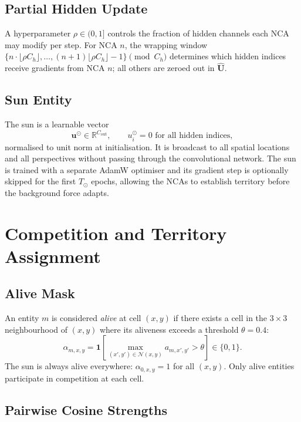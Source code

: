 \documentclass[11pt,a4paper]{article}
\newcommand{\R}{\mathbb{R}}
\theoremstyle{definition}
\begin{document}
\subsection{Partial Hidden Update}

A hyperparameter $\rho \in (0,1]$ controls the fraction of hidden channels each NCA may modify per step. For NCA $n$, the wrapping window $\{n \cdot \lfloor \rho C_h \rfloor, \ldots, (n+1)\lfloor \rho C_h \rfloor - 1\} \pmod{C_h}$ determines which hidden indices receive gradients from NCA $n$; all others are zeroed out in $\hat{\mathbf{U}}$.

\subsection{Sun Entity}
\label{sec:sun}

The sun is a learnable vector
\[
    \mathbf{u}^{\odot} \in \R^{C_\mathrm{out}}, \qquad u^{\odot}_i = 0 \text{ for all hidden indices},
\]
normalised to unit norm at initialisation. It is broadcast to all spatial locations and all perspectives without passing through the convolutional network. The sun is trained with a separate AdamW optimiser and its gradient step is optionally skipped for the first $T_{\odot}$ epochs, allowing the NCAs to establish territory before the background force adapts.

\section{Competition and Territory Assignment}
\label{sec:territory}

\subsection{Alive Mask}

An entity $m$ is considered \emph{alive} at cell $(x,y)$ if there exists a cell in the $3\times 3$ neighbourhood of $(x,y)$ where its aliveness exceeds a threshold $\theta = 0.4$:
\[
    \alpha_{m,x,y} = \mathbf{1}\!\left[\max_{(x',y')\in\mathcal{N}(x,y)} a_{m,x',y'} > \theta \right] \in \{0,1\}.
\]
The sun is always alive everywhere: $\alpha_{0,x,y} = 1$ for all $(x,y)$. Only alive entities participate in competition at each cell.

\subsection{Pairwise Cosine Strengths}
\end{document}

